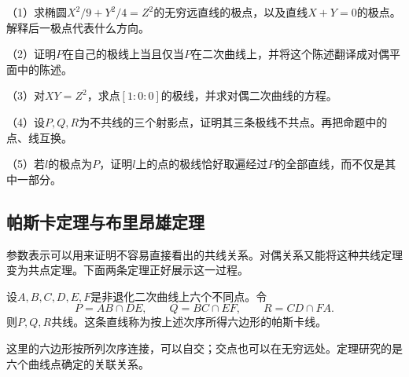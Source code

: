 \begin{exercise}
\mbox{}\par\nobreak
\begin{samepage}
（1）求椭圆\(X^2/9+Y^2/4=Z^2\)的无穷远直线的极点，以及直线\(X+Y=0\)的极点。解释后一极点代表什么方向。
\par
\end{samepage}

\begin{samepage}
（2）证明\(P\)在自己的极线上当且仅当\(P\)在二次曲线上，并将这个陈述翻译成对偶平面中的陈述。
\par
\end{samepage}

\begin{samepage}
（3）对\(XY=Z^2\)，求点\([1:0:0]\)的极线，并求对偶二次曲线的方程。
\par
\end{samepage}

\begin{samepage}
（4）设\(P,Q,R\)为不共线的三个射影点，证明其三条极线不共点。再把命题中的点、线互换。
\par
\end{samepage}

\begin{samepage}
（5）若\(l\)的极点为\(P\)，证明\(l\)上的点的极线恰好取遍经过\(P\)的全部直线，而不仅是其中一部分。
\par
\end{samepage}
\end{exercise}

\subsection{帕斯卡定理与布里昂雄定理}
\label{subsec:quadratic-pascal-and-brianchon}

参数表示可以用来证明不容易直接看出的共线关系。对偶关系又能将这种共线定理变为共点定理。下面两条定理正好展示这一过程。

\begin{theorem}[帕斯卡定理]\label{thm:quadratic-pascal}
设\(A,B,C,D,E,F\)是非退化二次曲线上六个不同点。令
\begin{equation}\label{eq:quadratic-pascal-intersections}
 P=AB\cap DE,\qquad Q=BC\cap EF,\qquad R=CD\cap FA.
\end{equation}
则\(P,Q,R\)共线。这条直线称为按上述次序所得六边形的{\heiti{}帕斯卡线}。
\end{theorem}

这里的六边形按所列次序连接，可以自交；交点也可以在无穷远处。定理研究的是六个曲线点确定的关联关系。

